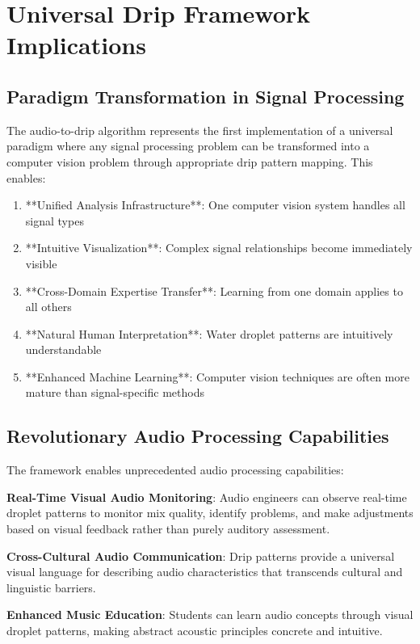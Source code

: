 \documentclass[12pt,a4paper]{article}
\begin{document}
\section{Universal Drip Framework Implications}

\subsection{Paradigm Transformation in Signal Processing}

The audio-to-drip algorithm represents the first implementation of a universal paradigm where any signal processing problem can be transformed into a computer vision problem through appropriate drip pattern mapping. This enables:

\begin{enumerate}
\item **Unified Analysis Infrastructure**: One computer vision system handles all signal types
\item **Intuitive Visualization**: Complex signal relationships become immediately visible
\item **Cross-Domain Expertise Transfer**: Learning from one domain applies to all others
\item **Natural Human Interpretation**: Water droplet patterns are intuitively understandable
\item **Enhanced Machine Learning**: Computer vision techniques are often more mature than signal-specific methods
\end{enumerate}

\subsection{Revolutionary Audio Processing Capabilities}

The framework enables unprecedented audio processing capabilities:

\textbf{Real-Time Visual Audio Monitoring}: Audio engineers can observe real-time droplet patterns to monitor mix quality, identify problems, and make adjustments based on visual feedback rather than purely auditory assessment.

\textbf{Cross-Cultural Audio Communication}: Drip patterns provide a universal visual language for describing audio characteristics that transcends cultural and linguistic barriers.

\textbf{Enhanced Music Education}: Students can learn audio concepts through visual droplet patterns, making abstract acoustic principles concrete and intuitive.
\end{document}
